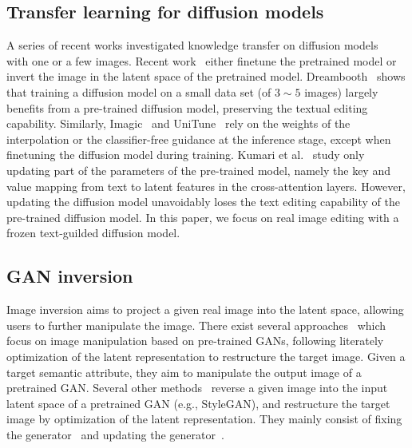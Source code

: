 \documentclass[twocolumn]{svjour3}          \smartqed  \usepackage{graphicx}
\begin{document}
\subsection{Transfer learning for diffusion models}
A series of recent works investigated knowledge transfer on diffusion models~\citep{song2020denoising,liu2023accelerating,mokady2022null,gal2022image,avrahami2023break,kwon2022diffusion,kim2022diffusionclip,gal2023encoder,xiao2023fastcomposer,han2023highly,tewel2023key,kumari2023multi,zhang2023prospect,dong2023prompt} with one or a few images. 
Recent work~\citep{Kawar2022ImagicTR,meng2021sdedit,cao2023masactrl,zhang2023adding,couairon2022diffedit,mou2023dragondiffusion,jia2023taming,zhang2023continuous,qiu2023controlling,levin2023differential,chen2023training}  either finetune the pretrained model or invert the image in the latent space of the  pretrained model. 
Dreambooth~\citep{ruiz2022dreambooth} shows that training a diffusion model on a small data set (of $3\sim5$ images) largely benefits from a pre-trained diffusion model, preserving the textual editing capability. Similarly,  Imagic~\citep{Kawar2022ImagicTR} and UniTune~\citep{valevski2022unitune} rely on the weights of the interpolation or the classifier-free guidance at the inference stage, except when finetuning the diffusion model during training. Kumari et al.~\citep{kumari2022multi} study only updating part of the parameters of the pre-trained model, namely the key and value mapping from text to latent features in the cross-attention layers.  
However, updating the diffusion model unavoidably loses the text editing capability of the pre-trained diffusion model. In this paper, we focus on real image editing with a frozen text-guilded diffusion model.

\subsection{GAN inversion}
Image inversion aims to project a given real image into the latent space,  allowing users to further manipulate the image. There exist several approaches~\citep{bermano2022state,creswell2018inverting,goetschalckx2019ganalyze,jahanian2019steerability,lipton2017precise,  xia2021gan,yeh2017semantic,zhu2016generative}  which focus on image manipulation based on pre-trained GANs, following literately optimization of the latent representation to restructure the target image.  Given a target semantic attribute, they aim to manipulate the output image 
of a pretrained GAN. Several other methods~\citep{abdal2019image2stylegan,zhu2020domain} reverse a given image into the input latent space of a pretrained GAN (e.g., StyleGAN), 
and restructure the target image by optimization of the latent representation.  They mainly consist of  fixing the generator~\cite{abdal2019image2stylegan,abdal2020image2stylegan++, richardson2020encoding,tov2021designing} and updating the generator~\cite{alaluf2021hyperstyle,roich2021pivotal}.
\end{document}

